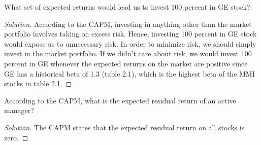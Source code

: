 \begin{problem}{2.4}
 What set of expected returns would lead us to invest 100 percent in GE stock?
\end{problem}

\begin{proof}[Solution]
 According to the CAPM, investing in anything other than the market portfolio involves taking on excess risk. Hence, investing 100 percent in GE stock would expose us to unnecessary risk. In order to minimize risk, we should simply invest in the market portfolio. If we didn't care about risk, we would invest 100 percent in GE whenever the expected returns on the market are positive since GE has a historical beta of 1.3 (table 2.1), which is the highest beta of the MMI stocks in table 2.1.
\end{proof}

\begin{problem}{2.5}
 According to the CAPM, what is the expected residual return of an active manager?
\end{problem}

\begin{proof}[Solution]
 The CAPM states that the expected residual return on all stocks is zero.
\end{proof}

